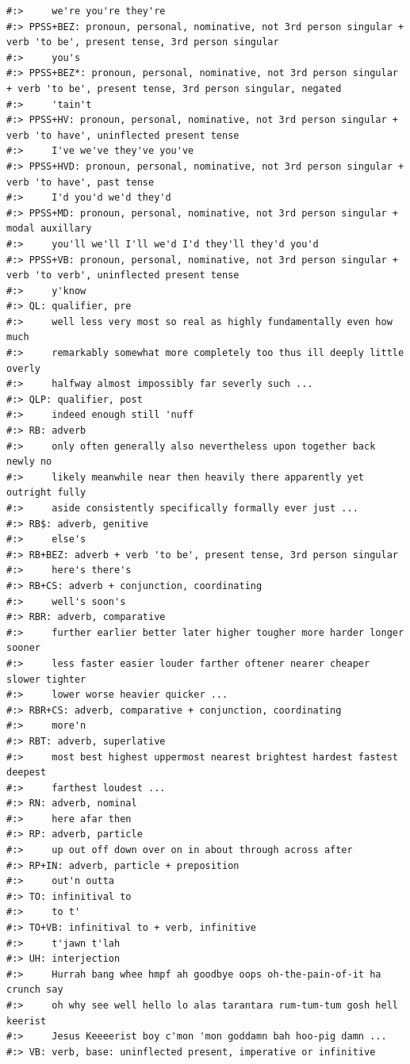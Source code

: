 \documentclass[
]{book}
\begin{document}
\begin{verbatim}
#:>     we're you're they're
#:> PPSS+BEZ: pronoun, personal, nominative, not 3rd person singular + verb 'to be', present tense, 3rd person singular
#:>     you's
#:> PPSS+BEZ*: pronoun, personal, nominative, not 3rd person singular + verb 'to be', present tense, 3rd person singular, negated
#:>     'tain't
#:> PPSS+HV: pronoun, personal, nominative, not 3rd person singular + verb 'to have', uninflected present tense
#:>     I've we've they've you've
#:> PPSS+HVD: pronoun, personal, nominative, not 3rd person singular + verb 'to have', past tense
#:>     I'd you'd we'd they'd
#:> PPSS+MD: pronoun, personal, nominative, not 3rd person singular + modal auxillary
#:>     you'll we'll I'll we'd I'd they'll they'd you'd
#:> PPSS+VB: pronoun, personal, nominative, not 3rd person singular + verb 'to verb', uninflected present tense
#:>     y'know
#:> QL: qualifier, pre
#:>     well less very most so real as highly fundamentally even how much
#:>     remarkably somewhat more completely too thus ill deeply little overly
#:>     halfway almost impossibly far severly such ...
#:> QLP: qualifier, post
#:>     indeed enough still 'nuff
#:> RB: adverb
#:>     only often generally also nevertheless upon together back newly no
#:>     likely meanwhile near then heavily there apparently yet outright fully
#:>     aside consistently specifically formally ever just ...
#:> RB$: adverb, genitive
#:>     else's
#:> RB+BEZ: adverb + verb 'to be', present tense, 3rd person singular
#:>     here's there's
#:> RB+CS: adverb + conjunction, coordinating
#:>     well's soon's
#:> RBR: adverb, comparative
#:>     further earlier better later higher tougher more harder longer sooner
#:>     less faster easier louder farther oftener nearer cheaper slower tighter
#:>     lower worse heavier quicker ...
#:> RBR+CS: adverb, comparative + conjunction, coordinating
#:>     more'n
#:> RBT: adverb, superlative
#:>     most best highest uppermost nearest brightest hardest fastest deepest
#:>     farthest loudest ...
#:> RN: adverb, nominal
#:>     here afar then
#:> RP: adverb, particle
#:>     up out off down over on in about through across after
#:> RP+IN: adverb, particle + preposition
#:>     out'n outta
#:> TO: infinitival to
#:>     to t'
#:> TO+VB: infinitival to + verb, infinitive
#:>     t'jawn t'lah
#:> UH: interjection
#:>     Hurrah bang whee hmpf ah goodbye oops oh-the-pain-of-it ha crunch say
#:>     oh why see well hello lo alas tarantara rum-tum-tum gosh hell keerist
#:>     Jesus Keeeerist boy c'mon 'mon goddamn bah hoo-pig damn ...
#:> VB: verb, base: uninflected present, imperative or infinitive

\end{verbatim}
\end{document}
